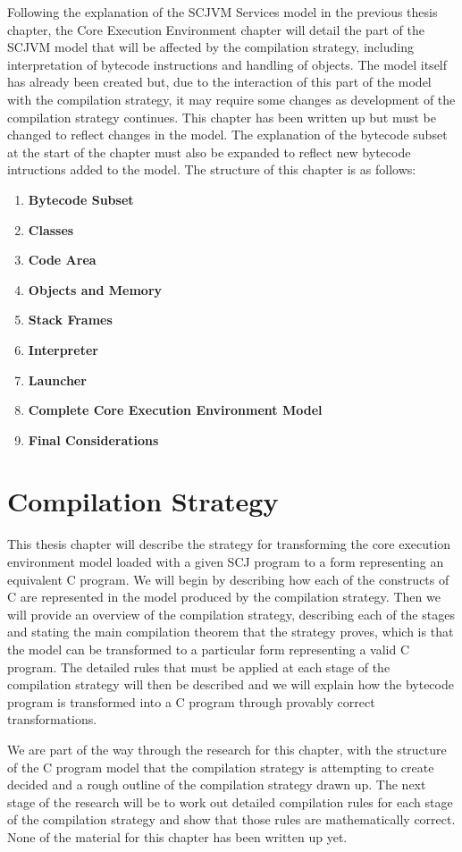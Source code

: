 \documentclass[a4paper,10pt]{report}
\let\olditem\item
\renewcommand{\item}[1][]{\olditem{\bfseries #1}}
\begin{document}
Following the explanation of the SCJVM Services model in the previous
thesis chapter, the Core Execution Environment chapter will detail the
part of the SCJVM model that will be affected by the compilation
strategy, including interpretation of bytecode instructions and
handling of objects.
The model itself has already been created but, due to the interaction
of this part of the model with the compilation strategy, it may
require some changes as development of the compilation strategy
continues.
This chapter has been written up but must be changed to reflect
changes in the model.
The explanation of the bytecode subset at the start of the chapter
must also be expanded to reflect new bytecode intructions added to the
model.
The structure of this chapter is as follows:
\begin{enumerate}
\item[Bytecode Subset]
\item[Classes]
\item[Code Area]
\item[Objects and Memory]
\item[Stack Frames]
\item[Interpreter]
\item[Launcher]
\item[Complete Core Execution Environment Model]
\item[Final Considerations]
\end{enumerate}

\section{Compilation Strategy}

This thesis chapter will describe the strategy for transforming the
core execution environment model loaded with a given SCJ program to a
form representing an equivalent C program.
We will begin by describing how each of the constructs of C are
represented in the \Circus{} model produced by the compilation
strategy.
Then we will provide an overview of the compilation strategy,
describing each of the stages and stating the main compilation theorem
that the strategy proves, which is that the model can be transformed
to a particular form representing a valid C program.
The detailed rules that must be applied at each stage of the
compilation strategy will then be described and we will explain how
the bytecode program is transformed into a C program through provably
correct transformations.

We are part of the way through the research for this chapter, with the
structure of the C program model that the compilation strategy is
attempting to create decided and a rough outline of the compilation
strategy drawn up.
The next stage of the research will be to work out detailed
compilation rules for each stage of the compilation strategy and show
that those rules are mathematically correct.
None of the material for this chapter has been written up yet.
\end{document}
